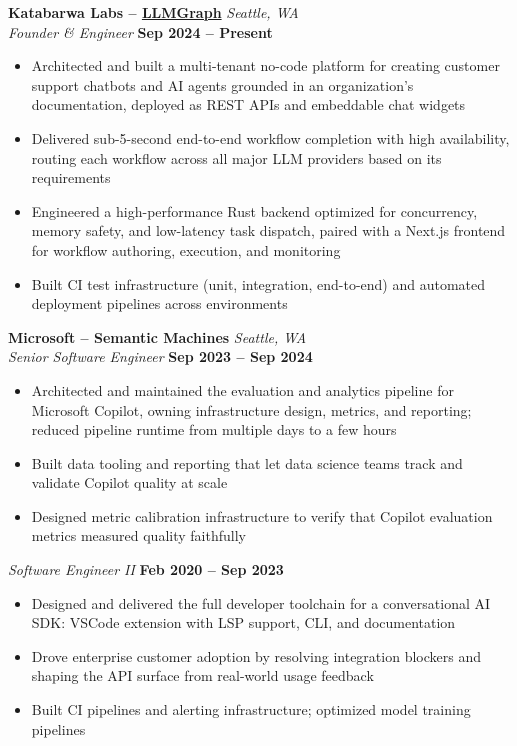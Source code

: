 \documentclass[10pt, letterpaper]{article}
\newcommand{\employer}[2]{%
  \vspace{6pt}\noindent\textbf{\large #1} \hfill \textit{#2} \\[1pt]
}
\newcommand{\role}[2]{%
  \noindent\textit{#1} \hfill \textbf{#2}\vspace{2pt}
}
\begin{document}
\employer{Katabarwa Labs -- \href{https://llmgraph.ai}{LLMGraph}}{Seattle, WA}
\role{Founder \& Engineer}{Sep 2024 -- Present}
\begin{itemize}
  \item Architected and built a multi-tenant no-code platform for creating customer support chatbots and AI agents grounded in an organization's documentation, deployed as REST APIs and embeddable chat widgets
  \item Delivered sub-5-second end-to-end workflow completion with high availability, routing each workflow across all major LLM providers based on its requirements
  \item Engineered a high-performance Rust backend optimized for concurrency, memory safety, and low-latency task dispatch, paired with a Next.js frontend for workflow authoring, execution, and monitoring
  \item Built CI test infrastructure (unit, integration, end-to-end) and automated deployment pipelines across environments
\end{itemize}

\employer{Microsoft -- Semantic Machines}{Seattle, WA}
\role{Senior Software Engineer}{Sep 2023 -- Sep 2024}
\begin{itemize}
  \item Architected and maintained the evaluation and analytics pipeline for Microsoft Copilot, owning infrastructure design, metrics, and reporting; reduced pipeline runtime from multiple days to a few hours
  \item Built data tooling and reporting that let data science teams track and validate Copilot quality at scale
  \item Designed metric calibration infrastructure to verify that Copilot evaluation metrics measured quality faithfully
\end{itemize}

\vspace{2pt}
\role{Software Engineer II}{Feb 2020 -- Sep 2023}
\begin{itemize}
  \item Designed and delivered the full developer toolchain for a conversational AI SDK: VSCode extension with LSP support, CLI, and documentation
  \item Drove enterprise customer adoption by resolving integration blockers and shaping the API surface from real-world usage feedback
  \item Built CI pipelines and alerting infrastructure; optimized model training pipelines
\end{itemize}
\end{document}
